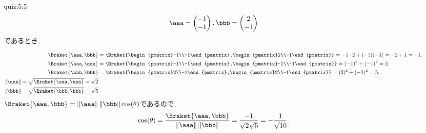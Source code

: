 \begin{answerof}{quiz:5:5}
  \begin{align*}
    \aaa=\begin{pmatrix}-1\\-1\end{pmatrix},
    \bbb=\begin{pmatrix}2\\-1\end{pmatrix}
  \end{align*}
  であるとき,

  \begin{align*}
    \Braket{\aaa,\bbb}
    &=\Braket{\begin{pmatrix}-1\\-1\end{pmatrix},\begin{pmatrix}2\\-1\end{pmatrix}}
    =-1\cdot2+(-1)(-1)=-2+1=-1.
    \\
    \Braket{\aaa,\aaa}
    &=\Braket{\begin{pmatrix}-1\\-1\end{pmatrix},\begin{pmatrix}-1\\-1\end{pmatrix}}
    =(-1)^2+(-1)^2=2.
\\
    \Braket{\bbb,\bbb}
    &=\Braket{\begin{pmatrix}2\\-1\end{pmatrix},\begin{pmatrix}2\\-1\end{pmatrix}}
    =(2)^2+(-1)^2=5.
    \\
    \|\aaa\|
    =\sqrt{\Braket{\aaa,\aaa}}
    =\sqrt{2}
\\
    \|\bbb\|
    =\sqrt{\Braket{\bbb,\bbb}}
    =\sqrt{5}
  \end{align*}
  $\Braket{\aaa,\bbb}=\left\|\aaa\right\|\left\|\bbb\right\|\cos(\theta)$であるので,
  \begin{align*}
    \cos(\theta)=\frac{\Braket{\aaa,\bbb}}{\left\|\aaa\right\|\left\|\bbb\right\|}
=\frac{-1}{\sqrt{2}\sqrt{5}}
=-\frac{1}{\sqrt{10}}.
  \end{align*}
\end{answerof}


